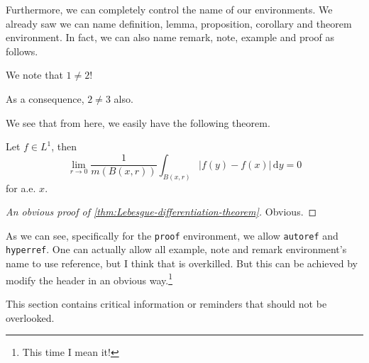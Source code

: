 Furthermore, we can completely control the name of our environments. We already saw we can name definition, lemma, proposition, corollary and theorem environment. In fact, we can also name remark, note, example and proof as follows.
\begin{eg}\label{eg}
  We note that \(1 \neq 2\)!
  \begin{note}
    As a consequence, \(2 \neq 3\) also.
  \end{note}

  \begin{remark}
    We see that from here, we easily have the following theorem.
    \begin{theorem}\label{thm:Lebesgue-differentiation-theorem}
      Let \(f\in L^1\), then
      \[
        \lim\limits_{r \to 0} \frac{1}{m(B(x, r))}\int_{B(x, r)}\left\vert f(y) - f(x) \right\vert   \,\mathrm{d}y = 0
      \]
      for a.e. \(x\).
    \end{theorem}
    \begin{proof}[An obvious proof of \autoref{thm:Lebesgue-differentiation-theorem}]
      Obvious.
    \end{proof}
  \end{remark}
\end{eg}
As we can see, specifically for the \texttt{proof} environment, we allow \texttt{autoref} and \texttt{hyperref}. One can actually allow all example, note and remark environment's name to use reference, but I think that is overkilled. But this can be achieved by modify the header in an obvious way.\footnote{This time I mean it!}

\begin{attention}
  This section contains critical information or reminders that should not be overlooked.
\end{attention}